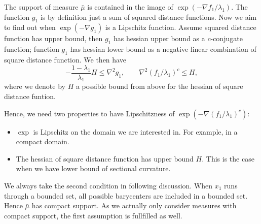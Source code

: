 The support of measure $\bar{\mu}$ is contained in the image of $\exp(-\nabla f_1 / \lambda_1)$.
The function $g_1$ is by definition just a sum of squared distance functions.
Now we aim to find out when $ \exp(- \nabla g_1 )$ is a Lipschitz function.
Assume squared distance function has upper bound,
then  $g_1$ has hessian upper bound as a $c$-conjugate function;
function $g_1$ has hessian lower bound as a negative linear combination of square distance function.
We then have
\begin{equation}
	\label{equa:hessian_bound_f}
	-\frac{1-\lambda_1}{\lambda_1} H \leq \nabla^2 g_1, \qquad \nabla^2 (f_1 / \lambda_1)^c \leq H,
\end{equation}
where we denote by $H$ a possible bound from above for the hessian of square distance funtion.

Hence, we need two properties to have Lipschitzness of $\exp(-\nabla (f_1 / \lambda_1)^c)$:
\begin{itemize}
	\item $ \exp $ is Lipschitz on the domain we are interested in.
	      For example, in a compact domain.
	\item The hessian of square distance function has upper bound $H$.
	      This is the case when we have lower bound of sectional curvature.
\end{itemize}

We always take the second condition in following discussion.
When $x_1$ runs through a bounded set,
all possible barycenters are included in a bounded set.
Hence $\bar{\mu}$ has compact support.
As we actually only consider measures with compact support, the first assumption is fullfilled as well.

